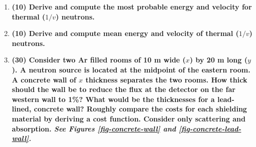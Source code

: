 \documentclass[11pt,a4paper]{article}
\begin{document}
\begin{enumerate}[leftmargin=*,topsep=0pt,font=\bfseries]
        
        
        
        
        
        
        
        
        
        
        
        
        
        \newpage
    \item\textbf{(10) Derive and compute the most probable energy and velocity for thermal ($1/v$) neutrons.}
        \vspace{0.25in}\\
        
        
        
        
        
        
        
        
        
        
        
        
        
        
        \newpage
    \item\textbf{(10) Derive and compute mean energy and velocity of thermal ($1/v$) neutrons.}
        \vspace{0.25in}\\
        
        
        
        
        
        
        
        
        
        
        
        
        \newpage
    \item\textbf{(30) Consider two Ar filled rooms of 10 m wide ($x$) by 20 m long ($y$). A neutron source is located at the midpoint of the eastern room. A concrete wall of $x$ thickness separates the two rooms. How thick should the wall be to reduce the flux at the detector on the far western wall to 1\%? What would be the thicknesses for a lead-lined, concrete wall? Roughly compare the costs for each shielding material by deriving a cost function. Consider only scattering and absorption. \textit{See Figures \ref{fig-concrete-wall} and \ref{fig-concrete-lead-wall}.}}
        \vspace{0.25in}\\















\end{enumerate}
\end{document}
